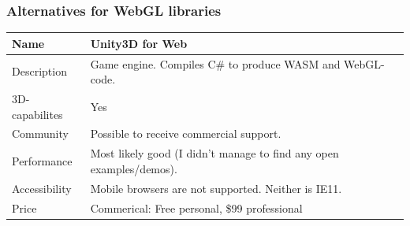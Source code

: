 \newpage{}

\hypertarget{alternatives-for-webgl-libraries}{%
\subsubsection{Alternatives for WebGL
libraries}\label{alternatives-for-webgl-libraries}}

\begin{longtable}[]{@{}ll@{}}
\toprule
\begin{minipage}[b]{0.46\columnwidth}\raggedright
Name\strut
\end{minipage} & \begin{minipage}[b]{0.48\columnwidth}\raggedright
Unity3D for Web\strut
\end{minipage}\tabularnewline
\midrule
\endhead
\begin{minipage}[t]{0.46\columnwidth}\raggedright
Description\strut
\end{minipage} & \begin{minipage}[t]{0.48\columnwidth}\raggedright
Game engine. Compiles C\# to produce WASM and WebGL-code.\strut
\end{minipage}\tabularnewline
\begin{minipage}[t]{0.46\columnwidth}\raggedright
3D-capabilites\strut
\end{minipage} & \begin{minipage}[t]{0.48\columnwidth}\raggedright
Yes\strut
\end{minipage}\tabularnewline
\begin{minipage}[t]{0.46\columnwidth}\raggedright
Community\strut
\end{minipage} & \begin{minipage}[t]{0.48\columnwidth}\raggedright
Possible to receive commercial support.\strut
\end{minipage}\tabularnewline
\begin{minipage}[t]{0.46\columnwidth}\raggedright
Performance\strut
\end{minipage} & \begin{minipage}[t]{0.48\columnwidth}\raggedright
Most likely good (I didn't manage to find any open
examples/demos).\strut
\end{minipage}\tabularnewline
\begin{minipage}[t]{0.46\columnwidth}\raggedright
Accessibility\strut
\end{minipage} & \begin{minipage}[t]{0.48\columnwidth}\raggedright
Mobile browsers are not supported. Neither is IE11.\strut
\end{minipage}\tabularnewline
\begin{minipage}[t]{0.46\columnwidth}\raggedright
Price\strut
\end{minipage} & \begin{minipage}[t]{0.48\columnwidth}\raggedright
Commerical: Free personal, \$99 professional\strut
\end{minipage}\tabularnewline
\bottomrule
\end{longtable}

